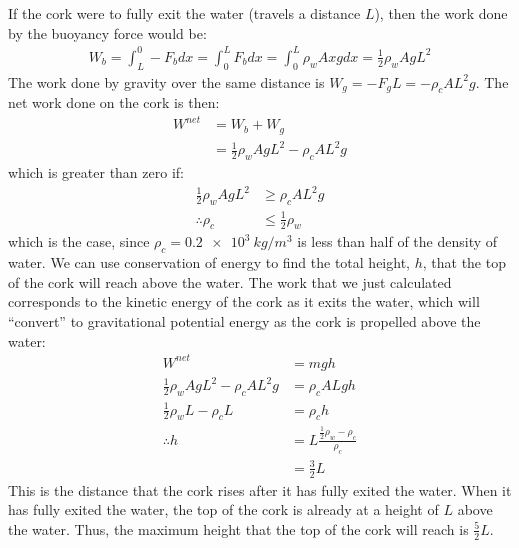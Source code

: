\begin{solution}
	If the cork were to fully exit the water (travels a distance $L$), then the work done by the buoyancy force would be:
	\begin{align*}
	W_b = \int_L^0 -F_b dx = \int_0^L F_b dx=\int_0^L \rho_w Axg dx =\frac{1}{2} \rho_w AgL^2
	\end{align*}
	The work done by gravity over the same distance is $W_g=-F_gL=-\rho_c AL^2g$. The net work done on the cork is then:
	\begin{align*}
	W^{net}&=W_b+W_g\\
	&=\frac{1}{2} \rho_w AgL^2-\rho_c AL^2g
	\end{align*}
	which is greater than zero if:
	\begin{align*}
	\frac{1}{2} \rho_w AgL^2&\geq\rho_c AL^2g \\
	\therefore \rho_c&\leq\frac{1}{2} \rho_w 
	\end{align*}
	which is the case, since $\rho_c=\SI{0.2e3}{kg/m^3}$ is less than half of the density of water. We can use conservation of energy to find the total height, $h$, that the top of the cork will reach above the water. The work that we just calculated corresponds to the kinetic energy of the cork as it exits the water, which will ``convert'' to gravitational potential energy as the cork is propelled above the water:
	\begin{align*}
	W^{net}&=mgh \\
	\frac{1}{2} \rho_w AgL^2-\rho_c AL^2g &=\rho_c ALgh\\
	\frac{1}{2} \rho_w L-\rho_c L &=\rho_c h\\
	\therefore h &= L\frac{\frac{1}{2} \rho_w - \rho_c}{\rho_c}\\
	&=\frac{3}{2} L
	\end{align*} 
	This is the distance that the cork rises after it has fully exited the water. When it has fully exited the water, the top of the cork is already at a height of $L$ above the water. Thus, the maximum height that the top of the cork will reach is $\frac{5}{2}L$.
	
\end{solution}

